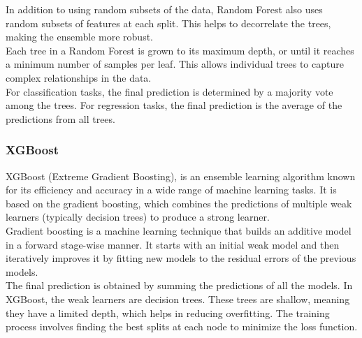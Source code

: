 In addition to using random subsets of the data, Random Forest also uses random subsets of features at each split. This helps to decorrelate the trees, making the ensemble more robust.\\

Each tree in a Random Forest is grown to its maximum depth, or until it reaches a minimum number of samples per leaf. This allows individual trees to capture complex relationships in the data.\\

For classification tasks, the final prediction is determined by a majority vote among the trees. For regression tasks, the final prediction is the average of the predictions from all trees.

\subsubsection{XGBoost}


XGBoost (Extreme Gradient Boosting), is an ensemble learning algorithm known for its efficiency and accuracy in a wide range of machine learning tasks. It is based on the gradient boosting, which combines the predictions of multiple weak learners (typically decision trees) to produce a strong learner. \\

Gradient boosting is a machine learning technique that builds an additive model in a forward stage-wise manner. It starts with an initial weak model and then iteratively improves it by fitting new models to the residual errors of the previous models. \\

The final prediction is obtained by summing the predictions of all the models. In XGBoost, the weak learners are decision trees. These trees are shallow, meaning they have a limited depth, which helps in reducing overfitting. The training process involves finding the best splits at each node to minimize the loss function.





